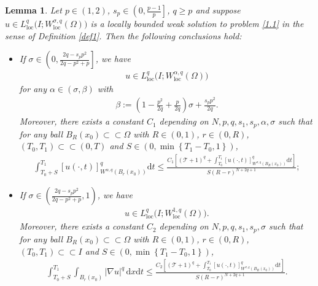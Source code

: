 \documentclass[reqno,10pt]{amsart}
\numberwithin{equation}{section}
\newtheorem{lemma}[theorem]{Lemma}
\begin{document}
\begin{lemma}
	\label{lem19}
	Let $p\in(1,2)$, $s_p\in\left( 0,\frac{p-1}{p}\right]$, $q\ge p$ and suppose $u\in L^q_{\mathrm{loc}}\bigl(I;W^{\sigma,q}_{\mathrm{loc}}(\Omega)\bigl)$ is a locally bounded weak solution to problem \eqref{1.1} in the sense of Definition \ref{def1}. Then the following conclusions hold:
	\begin{itemize}
		\item[(i)] If $\sigma\in \left(0,\frac{2q-s_pp^2}{2q-p^2+p}\right]$, we have
		\begin{align*}
			u\in L^q_{\mathrm{loc}}\bigl(I;W^{\alpha,q}_{\mathrm{loc}}(\Omega)\bigl)
		\end{align*}
		for any $\alpha\in(\sigma,\beta)$ with
		\begin{align*}
			\beta:=\left(1-\frac{p^2}{2q}+\frac{p}{2q}\right)\sigma+\frac{s_pp^2}{2q}. 
		\end{align*}
		Moreover, there exists a constant $C_1$ depending on $N,p,q,s_1,s_p,\alpha,\sigma$ such that for any ball $B_R(x_0)\subset\subset\Omega$ with $R\in(0,1)$, $r\in (0,R)$, $(T_0,T_1)\subset\subset(0,T)$ and $S\in \left( 0,\min\left\lbrace T_1-T_0,1\right\rbrace \right) $,
		\begin{align*}
			\int_{T_0+S}^{T_1}[u(\cdot,t)]^q_{W^{\alpha,q}\left( B_r(x_0)\right)}\mathrm{d}t\le\frac{C_1\left[\left(\mathcal{T}+1\right)^q+\int_{T_0}^{T_1}[u(\cdot,t)]^q_{W^{\sigma,q}\left( B_R(x_0)\right)}\mathrm{d}t\right]}{S(R-r)^{N+2q+1}};
		\end{align*}
		\item[(ii)] If $\sigma\in\left(\frac{2q-s_pp^2}{2q-p^2+p},1\right)$, we have
		\begin{align*}
			u\in L^q_{\mathrm{loc}}\bigl(I;W^{1,q}_{\mathrm{loc}}(\Omega)\bigl).
		\end{align*}
		Moreover, there exists a constant $C_2$ depending on $N,p,q,s_1,s_p,\sigma$ such that for any ball $B_R(x_0)\subset\subset\Omega$ with $R\in(0,1)$, $r\in (0,R)$, $(T_0,T_1)\subset\subset I$ and $S\in \left( 0,\min\left\lbrace T_1-T_0,1\right\rbrace \right) $,
		\begin{align*}
			\int_{T_0+S}^{T_1}\int_{B_r(x_0)}|\nabla u|^q\,\mathrm{d}x\mathrm{d}t\le\frac{C_2\left[\left(\mathcal{T}+1\right)^q+\int_{T_0}^{T_1}[u(\cdot,t)]^q_{W^{\sigma,q}\left( B_R(x_0)\right)}\mathrm{d}t\right]}{S(R-r)^{N+2q+1}}.
		\end{align*}
	\end{itemize}
\end{lemma}
\end{document}
